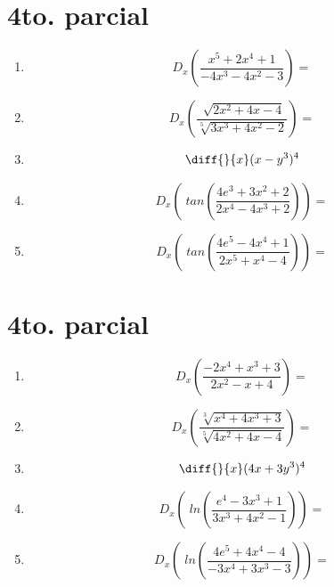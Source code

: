 \documentclass[oneside,spanish,letter]{article}
\begin{document}
\section{4to. parcial}
\begin{enumerate}
 \item $$ D_x \left( \frac{x^5+2x^4+1}{-4x^3-4x^2-3}\right)=$$
 \item $$ D_x \left( \frac{\sqrt[]{2x^2+4x-4}}{\sqrt[5]{3x^3+4x^2-2}}\right)=$$
\item $$\diff{}{x}(x-y^3)^4$$
 \item $$ D_x \left(\;tan\left( \frac{4e^3+3x^2+2}{2x^4-4x^3+2}\right)\right)=$$
 \item $$ D_x \left(\;tan\left( \frac{4e^5-4x^4+1}{2x^5+x^4-4}\right)\right)=$$
 \end{enumerate}
  \newpage
\section{4to. parcial}
\begin{enumerate}
 \item $$ D_x \left( \frac{-2x^4+x^3+3}{2x^2-x+4}\right)=$$
 \item $$ D_x \left( \frac{\sqrt[3]{x^4+4x^3+3}}{\sqrt[5]{4x^2+4x-4}}\right)=$$
\item $$\diff{}{x}(4x+3y^3)^4$$
 \item $$ D_x \left(\;ln\left( \frac{e^4-3x^3+1}{3x^3+4x^2-1}\right)\right)=$$
 \item $$ D_x \left(\;ln\left( \frac{4e^5+4x^4-4}{-3x^4+3x^3-3}\right)\right)=$$
 \end{enumerate}
  \newpage
\end{document}
